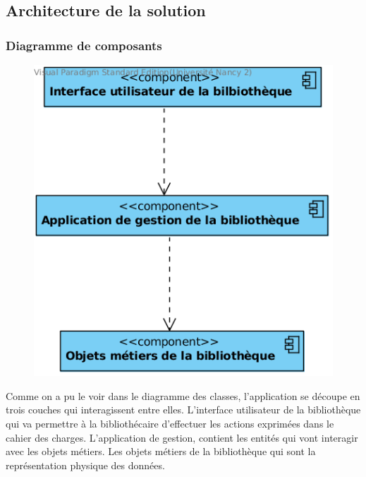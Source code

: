 \documentclass[a4paper,12pt]{article}
\begin{document}
\subsection{Architecture de la solution}
\label{sec:orgheadline15}

\subsubsection{Diagramme de composants}
\label{sec:orgheadline13}

\begin{figure}
\vspace{-17pt}

\label{wrap-fig:emprunt-reserve}
\includegraphics[width=\linewidth]{./res/img/ihm.png}
\end{figure}

Comme on a pu le voir dans le diagramme des classes, l’application se
découpe en trois couches qui interagissent entre elles. L’interface
utilisateur de la bibliothèque qui va permettre à la bibliothécaire
d’effectuer les actions exprimées dans le cahier des charges. L’application
de gestion, contient les entités qui vont interagir avec les objets métiers.
Les objets métiers de la bibliothèque qui sont la représentation physique
des données.
\end{document}
